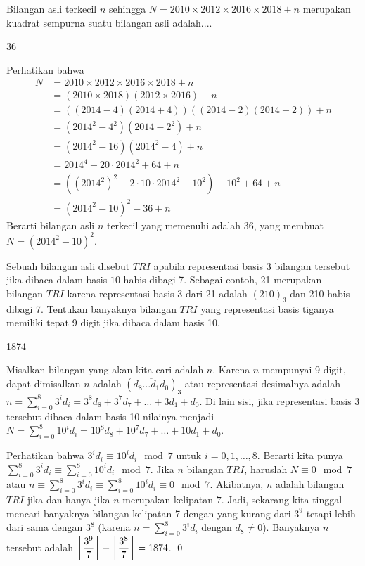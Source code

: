 \documentclass[12pt]{scrartcl}
\begin{document}
	\begin{soalbaru}
		Bilangan asli terkecil $n$ sehingga $N = 2010 \times 2012 \times 2016 \times 2018 + n$ merupakan kuadrat sempurna suatu bilangan asli adalah....
		
		\begin{jawaban}
		36
		\end{jawaban}
		\begin{solusi}
		Perhatikan bahwa \begin{align*}
		N &= 2010 \times 2012 \times 2016 \times 2018 + n\\
		  &= (2010 \times 2018)(2012 \times 2016) + n\\
		  &= ((2014-4)(2014+4))((2014-2)(2014+2))+n\\
		  &= (2014^2-4^2)(2014-2^2)+n\\
		  &= (2014^2-16)(2014^2-4)+n\\
		  &= 2014^4-20 \cdot 2014^2 + 64+n\\
		  &= ((2014^2)^2-2\cdot 10 \cdot 2014^2 + 10^2) -10^2+64+n\\
		  &= (2014^2-10)^2-36+n	  
		\end{align*}Berarti bilangan asli $n$ terkecil yang memenuhi adalah 36, yang membuat $N = (2014^2-10)^2$.
		\end{solusi}
	\end{soalbaru}
	
	\begin{soalbaru}
		Sebuah bilangan asli disebut $TRI$ apabila representasi basis $3$ bilangan tersebut jika dibaca dalam basis $10$ habis dibagi 7. Sebagai contoh, 21 merupakan bilangan $TRI$ karena representasi basis 3 dari 21 adalah $(210)_3$ dan 210 habis dibagi 7. Tentukan banyaknya bilangan $TRI$ yang representasi basis tiganya memiliki tepat 9 digit jika dibaca dalam basis 10.
		
		\begin{jawaban}
		1874
		\end{jawaban}
		\begin{solusi}
		Misalkan bilangan yang akan kita cari adalah $n$. Karena $n$ mempunyai 9 digit, dapat dimisalkan $n$ adalah $(\overline{d_{8}\dots d_1 d_0})_3$ atau representasi desimalnya adalah $n = \sum_{i=0}^{8} 3^id_i = 3^8d_8+3^{7}d_{7}+\dots+3d_1+d_0$. Di lain sisi, jika representasi basis 3 tersebut dibaca dalam basis 10 nilainya menjadi $N = \sum_{i=0}^{8} 10^id_i = 10^8d_8+10^{7}d_{7}+\dots+10d_1+d_0$.
		
		Perhatikan bahwa $3^id_i \equiv 10^id_i \mod 7$ untuk $i=0,1,\dots,8$. Berarti kita punya $\sum_{i=0}^{8} 3^id_i \equiv \sum_{i=0}^{8} 10^id_i \mod 7$. Jika $n$ bilangan $TRI$, haruslah $N \equiv 0 \mod 7$ atau $n\equiv\sum_{i=0}^{8} 3^id_i \equiv \sum_{i=0}^{8} 10^id_i \equiv 0 \mod 7$. Akibatnya, $n$ adalah bilangan $TRI$ jika dan hanya jika $n$ merupakan kelipatan $7$. Jadi, sekarang kita tinggal mencari banyaknya bilangan kelipatan 7 dengan yang kurang dari $3^9$ tetapi lebih dari sama dengan $3^8$ (karena $n = \sum_{i=0}^{8} 3^id_i$ dengan $d_8 \neq 0$). Banyaknya $n$ tersebut adalah $\left\lfloor \dfrac{3^9}{7} \right\rfloor-\left\lfloor \dfrac{3^8}{7} \right\rfloor=1874$. \qed
		\end{solusi}
	\end{soalbaru}
	
\end{document}
